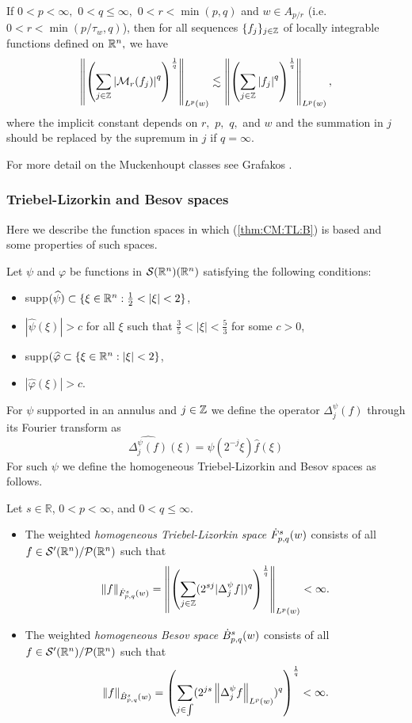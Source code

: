 \begin{theorem}
If $0<p<\infty,$ $0<q\le \infty,$  $0<r <\min(p,q)$ and $w \in A_{p/r}$ (i.e. $0<r<\min(p/\tau_w,q)$), then for all sequences $\{f_{j}\}_{j\in\ent}$ of locally integrable functions defined on $\rn,$ we have
 \begin{equation*}
 \norm{\left(\sum_{j\in\ent}\abs{\M_r (f_j)}^q\right)^{\frac{1}{q}}}{\lebw{p}{w}}\lesssim
 \norm{\left(\sum_{j\in\ent}\abs{f_j}^q\right)^{\frac{1}{q}}}{\lebw{p}{w}},\label{eq:wFS}
 \end{equation*}
where the implicit constant depends on $r,$ $p,$ $q,$ and $w$ and the summation in $j$ should be replaced by the supremum in $j$ if $q=\infty.$
\end{theorem}
For more detail on the Muckenhoupt classes see Grafakos \cite{MR3243741}.

\subsubsection{Triebel-Lizorkin and Besov spaces}\label{TL_B_section}
Here we describe the function spaces in which (\ref{thm:CM:TL:B}) is based and some properties of such spaces. 

Let $\psi$ and $\varphi$ be functions in $\sw(\rn)$ satisfying the following conditions:
\begin{itemize}
\item supp$(\widehat{\psi})\subset\{\xi\in\rn : \frac{1}{2} < |\xi| <2\}$,
\item $|\widehat{\psi}(\xi)|>c$ for all $\xi$ such that $\frac{3}{5} < |\xi| < \frac{5}{3}$ for some $c>0$,
\item supp$(\widehat{\varphi}\subset \{\xi\in\rn : |\xi| < 2\}$,
\item $|\widehat{\varphi}(\xi)|>c$. 
\end{itemize}
For $\psi$ supported in an annulus and $j\in\ent$ we define the operator $\Delta^\psi_j(f)$ through its Fourier transform as \[\widehat{\Delta^\psi_j (f)}(\xi) = \psi(2^{-j}\xi)\widehat{f}(\xi)\]
For such $\psi$ we define the homogeneous Triebel-Lizorkin and Besov spaces as follows.

\begin{dfn}\label{TL_B_def}
Let $s\in\mathbb{R}$, $0<p<\infty$, and $0<q\leq\infty$.
\begin{itemize}
\item The weighted \textit{homogeneous Triebel-Lizorkin space} $\tlw{p}{s}{q}{w}$ consists of all $f\in \swp/\mathcal{P}(\rn)$ such that 
\begin{equation*}
\norm{f}{\tlw{p}{s}{q}{w}}=\norm{\left(\sum_{j\in\ent}(2^{sj}|\Delta^\psi_jf|)^q\right)^{\frac{1}{q}}}{\lebw{p}{w}}<\infty.
\end{equation*}
\item The weighted \textit{homogeneous Besov space} $\besw{p}{s}{q}{w}$ consists of all $f\in \swp/\mathcal{P}(\rn)$ such that 
\begin{equation}
\norm{f}{\besw{p}{s}{q}{w}} = \left(\sum_{j\in\int} (2^{js}\norm{\Delta^\psi_jf}{L^p(w)})^q\right)^{\frac{1}{q}} < \infty.
\end{equation}
\end{itemize}
\end{dfn}

